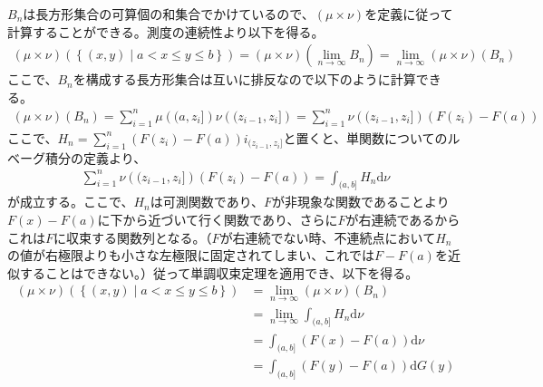 \documentclass{article}
\begin{document}
$B_n$は長方形集合の可算個の和集合でかけているので、$(\mu \times \nu)$を定義に従って計算することができる。測度の連続性より以下を得る。
\begin{align*}
	(\mu \times \nu)\left( \left\{ (x, y) \mid a < x \leq y \leq b \right\} \right) = (\mu \times \nu) \left( \lim_{n\to \infty} B_n \right) = \lim_{n \to \infty} (\mu \times \nu)\left( B_n \right)
\end{align*}
ここで、$B_n$を構成する長方形集合は互いに排反なので以下のように計算できる。
\begin{align*}
	(\mu \times \nu)\left( B_n \right) = \sum_{i = 1}^n \mu \left( (a, z_i] \right) \nu \left( (z_{i-1},z_i] \right) = \sum_{i = 1}^n \nu \left( (z_{i-1},z_i] \right) \left( F(z_i) - F(a) \right)
\end{align*}
ここで、$H_n = \sum_{i = 1}^n \left( F(z_i) - F(a) \right) i_{(z_{i-1}, z_i]}$と置くと、単関数についてのルベーグ積分の定義より、
\begin{align*}
	\sum_{i = 1}^n \nu \left( (z_{i-1},z_i] \right) \left( F(z_i) - F(a) \right) = \int_{(a, b]} H_n \mathrm{d}\nu
\end{align*}
が成立する。ここで、$H_n$は可測関数であり、$F$が非現象な関数であることより$F(x) - F(a)$に下から近づいて行く関数であり、さらに$F$が右連続であるからこれは$F$に収束する関数列となる。（$F$が右連続でない時、不連続点において$H_n$の値が右極限よりも小さな左極限に固定されてしまい、これでは$F - F(a)$を近似することはできない。）従って単調収束定理を適用でき、以下を得る。
\begin{align*}
	(\mu \times \nu)\left( \left\{ (x, y) \mid a < x \leq y \leq b \right\} \right) &= \lim_{n \to \infty} (\mu \times \nu)\left( B_n \right)\\
	&=  \lim_{n \to \infty} \int_{(a, b]} H_n \mathrm{d}\nu\\
	&= \int_{(a,b]}(F(x) - F(a)) \mathrm{d}\nu\\
	&= \int_{(a, b]} (F(y) - F(a)) \mathrm{d}G(y)
\end{align*}
\end{document}
